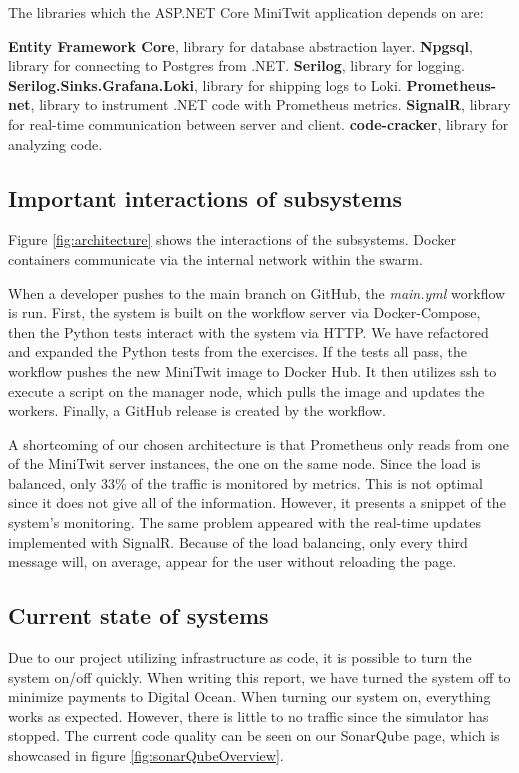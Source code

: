 \noindent The libraries which the ASP.NET Core MiniTwit application depends on are:

\begin{outline}
    \1 \textbf{Entity Framework Core}, library for database abstraction layer.
    \1 \textbf{Npgsql}, library for connecting to Postgres from .NET.
    \1 \textbf{Serilog}, library for logging.
    \1 \textbf{Serilog.Sinks.Grafana.Loki}, library for shipping logs to Loki.
    \1 \textbf{Prometheus-net}, library to instrument .NET code with Prometheus metrics.
    \1 \textbf{SignalR}, library for real-time communication between server and client.
    \1 \textbf{code-cracker}, library for analyzing code.
\end{outline}

\subsection{Important interactions of subsystems}

Figure \ref{fig:architecture} shows the interactions of the subsystems. Docker containers communicate via the internal network within the swarm.

When a developer pushes to the main branch on GitHub, the \textit{main.yml} workflow is run. First, the system is built on the workflow server via Docker-Compose, then the Python tests interact with the system via HTTP. We have refactored and expanded the Python tests from the exercises. If the tests all pass, the workflow pushes the new MiniTwit image to Docker Hub. It then utilizes ssh to execute a script on the manager node, which pulls the image and updates the workers. Finally, a GitHub release is created by the workflow.

A shortcoming of our chosen architecture is that Prometheus only reads from one of the MiniTwit server instances, the one on the same node. Since the load is balanced, only 33\% of the traffic is monitored by metrics. This is not optimal since it does not give all of the information. However, it presents a snippet of the system's monitoring. The same problem appeared with the real-time updates implemented with SignalR. Because of the load balancing, only every third message will, on average, appear for the user without reloading the page.

\subsection{Current state of systems}
Due to our project utilizing infrastructure as code, it is possible to turn the system on/off quickly. When writing this report, we have turned the system off to minimize payments to Digital Ocean. When turning our system on, everything works as expected. However, there is little to no traffic since the simulator has stopped. The current code quality can be seen on our SonarQube page, which is showcased in figure \ref{fig:sonarQubeOverview}.

